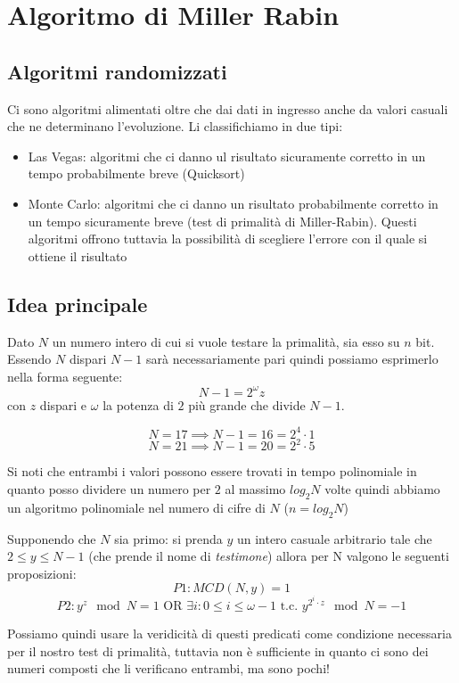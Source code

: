 \section{Algoritmo di Miller Rabin}
\subsection{Algoritmi randomizzati}
Ci sono algoritmi alimentati oltre che dai dati in ingresso anche da valori casuali che ne determinano l'evoluzione. Li classifichiamo in due tipi:
\begin{itemize}
    \item Las Vegas: algoritmi che ci danno ul risultato sicuramente corretto in un tempo probabilmente breve (Quicksort)
    \item Monte Carlo: algoritmi che ci danno un risultato probabilmente corretto in un tempo sicuramente breve (test di primalità di Miller-Rabin). Questi algoritmi offrono tuttavia la possibilità di scegliere l'errore con il quale si ottiene il risultato
\end{itemize}

\subsection{Idea principale}
Dato $N$ un numero intero di cui si vuole testare la primalità, sia esso su $n$ bit. Essendo $N$ dispari $N-1$ sarà necessariamente pari quindi possiamo esprimerlo nella forma seguente:
$$
    N-1 = 2^{\omega}z
$$
con $z$ dispari e $\omega$ la potenza di $2$ più grande che divide $N-1$.

$$ N = 17 \implies N-1 = 16 = 2^{4} \cdot 1 $$
$$ N = 21 \implies N-1 = 20 = 2^{2} \cdot 5 $$

Si noti che entrambi i valori possono essere trovati in tempo polinomiale in quanto posso dividere un numero per $2$ al massimo $log_2N$ volte quindi abbiamo un algoritmo polinomiale nel numero di cifre di $N$ ($n = log_2N$)

Supponendo che $N$ sia primo: si prenda $y$ un intero casuale arbitrario tale che $ 2 \leq y \leq N-1 $ (che prende il nome di \emph{testimone}) allora per N valgono le seguenti proposizioni:
$$ P1: MCD(N, y) = 1 $$
$$ P2: y^z \mod N = 1 \text{ OR } \exists i: 0 \leq i \leq \omega - 1 \text{ t.c. } y^{2^i \cdot z} \mod N = -1 $$

Possiamo quindi usare la veridicità di questi predicati come condizione necessaria per il nostro test di primalità, tuttavia non è sufficiente in quanto ci sono dei numeri composti che li verificano entrambi, ma sono pochi!

